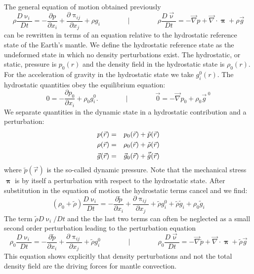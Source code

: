 The general equation of motion obtained previously
\begin{equation}
\rho \frac{D\upnu_i}{Dt} = -\frac{\partial p}{\partial x_i} + 
\frac{\partial \uppi_{ij}}{\partial x_j} + \rho g_i
\qquad
\qquad
\bigg\rvert
\qquad
\qquad
\rho \frac{D\vec\upnu}{Dt} = -\vec\nabla p + \vec\nabla \cdot {\bm \uppi} + \rho \vec{g}
\end{equation}
can be rewritten in terms
of an equation relative to the hydrostatic reference state of the Earth's mantle. We define
the hydrostatic reference state as the undeformed state in which no density perturbations
exist. The hydrostatic, or static, pressure is $p_0(r)$ and the density field in the hydrostatic
state is $\rho_0(r)$. For the acceleration of gravity in the hydrostatic state we take $g_i^0(r)$. 
The hydrostatic quantities obey the equilibrium equation: 
\begin{equation}
0 = -\frac{\partial p_0}{\partial x_i} + \rho_0 g_i^0.
\qquad
\qquad
\bigg\rvert
\qquad
\qquad
\vec{0} = -\vec\nabla p_0 + \rho_0 \vec{g}^{\; 0}
\end{equation}
We separate quantities in the dynamic state in a hydrostatic contribution and a
perturbation:
\begin{eqnarray}
p(\vec{r}) &=& p_0(\vec{r}) + {\tilde p}(\vec{r}) \nonumber\\
\rho(\vec{r}) &=& \rho_0(\vec{r}) + {\tilde\rho}(\vec{r}) \nonumber\\
\vec{g}(\vec{r}) &=& \vec{g}_0(\vec{r}) + \vec{\tilde{g}}(\vec{r}) \nonumber
\end{eqnarray}
where ${\tilde p}(\vec{r})$ is the so-called dynamic pressure.
Note that the mechanical stress ${\bm \uppi}$ is by
itself a perturbation with respect to the hydrostatic state. After substitution in the equation
of motion the hydrostatic terms cancel and we find:
\begin{equation}
(\rho_0 + {\tilde\rho})  \frac{D\upnu_i}{Dt}
= -\frac{\partial {\tilde p}}{\partial x_i} + \frac{\partial \uppi_{ij}}{\partial x_j}
+ {\tilde\rho} g_i^0 +  {\tilde\rho} {\tilde{g}_i}
+ \rho_0  \tilde{g}_i
\label{eq:md34a}
\end{equation}
The term $ {\tilde\rho} D\upnu_i/Dt$ and the the last two terms can often be 
neglected as a small second order
perturbation leading to the perturbation equation
\begin{equation}
\rho_0   \frac{D\upnu_i}{Dt}
= -\frac{\partial {\tilde p}}{\partial x_i} + \frac{\partial \uppi_{ij}}{\partial x_j}
+ {\tilde\rho} g_i^0 
\qquad
\qquad
\bigg\rvert
\qquad
\qquad
\rho_0   \frac{D\vec\upnu}{Dt}
=
-\vec\nabla {\tilde p} + \vec\nabla \cdot {\bm \uppi} + {\tilde\rho} \vec{g}
\label{eq:md34b}
\end{equation}
This equation shows explicitly that density perturbations and not the total density field
are the driving forces for mantle convection.

